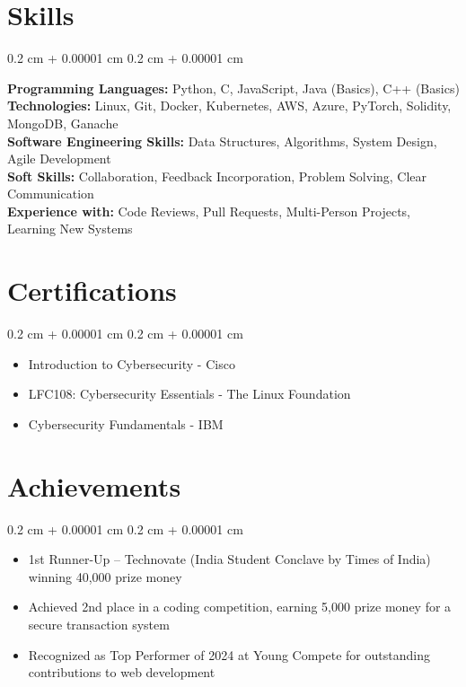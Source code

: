 \documentclass[10pt, letterpaper]{article}
\newenvironment{highlights}{
    \begin{itemize}[
        topsep=0.10 cm,
        parsep=0.10 cm,
        partopsep=0pt,
        itemsep=0pt,
        leftmargin=0.4 cm + 10pt
    ]
}{
    \end{itemize}
} %
\newenvironment{onecolentry}{
    \begin{adjustwidth}{
        0.2 cm + 0.00001 cm
    }{
        0.2 cm + 0.00001 cm
    }
}{
    \end{adjustwidth}
} %
\let\hrefWithoutArrow\href
\renewcommand{\href}[2]{\hrefWithoutArrow{#1}{\ifthenelse{\equal{#2}{}}{ }{#2 }\raisebox{.15ex}{\footnotesize \faExternalLink*}}}
\begin{document}
    \section{Skills}
    \begin{onecolentry}
        \textbf{Programming Languages:} Python, C, JavaScript, Java (Basics), C++ (Basics) \\
        \textbf{Technologies:} Linux, Git, Docker, Kubernetes, AWS, Azure, PyTorch, Solidity, MongoDB, Ganache \\
        \textbf{Software Engineering Skills:} Data Structures, Algorithms, System Design, Agile Development \\
        \textbf{Soft Skills:} Collaboration, Feedback Incorporation, Problem Solving, Clear Communication \\
        \textbf{Experience with:} Code Reviews, Pull Requests, Multi-Person Projects, Learning New Systems
    \end{onecolentry}
    \section{Certifications}
    \begin{onecolentry}
        \begin{highlights}
            \item Introduction to Cybersecurity - Cisco \href{https://www.credly.com/badges/a7c00b29-a55e-42e6-8fa6-90174db3e9d7/public_url}{\textcolor{primaryColor}{\small [View Certificate]}}
            \item LFC108: Cybersecurity Essentials - The Linux Foundation \href{https://www.credly.com/badges/50d5dd68-4744-4b04-b719-3f0658e97910/public_url}{\textcolor{primaryColor}{\small [View Certificate]}}
            \item Cybersecurity Fundamentals - IBM \href{https://www.credly.com/badges/0e03da41-f13a-4a06-9835-caf8a48ac10d/public_url}{\textcolor{primaryColor}{\small [View Certificate]}}
        \end{highlights}
    \end{onecolentry}
    \section{Achievements}
    \begin{onecolentry}
        \begin{highlights}
            \item 1st Runner-Up – Technovate (India Student Conclave by Times of India) winning 40,000 prize money
            \item Achieved 2nd place in a coding competition, earning 5,000 prize money for a secure transaction system
            \item Recognized as Top Performer of 2024 at Young Compete for outstanding contributions to web development
        \end{highlights}
    \end{onecolentry}
\end{document}
